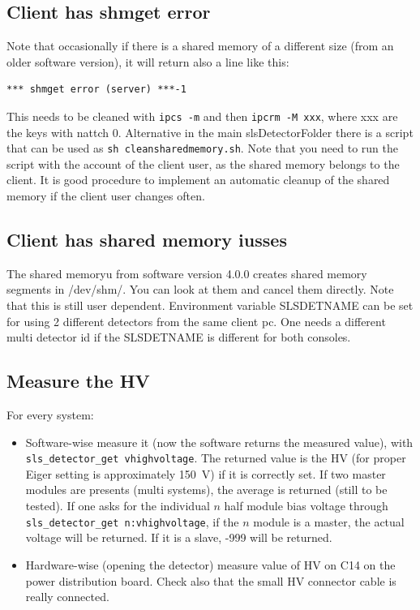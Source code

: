 \documentclass{article}
\begin{document}
\subsection{Client has \textbf{shmget error}}
Note that occasionally if there is a shared memory of a different size (from an older software version), it will return also a line like this:
\begin{verbatim}
*** shmget error (server) ***-1
\end{verbatim}
This needs to be cleaned with {\tt{ipcs -m}} and then {\tt{ipcrm -M xxx}}, where xxx are the keys with nattch 0. Alternative in the main slsDetectorFolder there is a script that can be used as {\tt{sh cleansharedmemory.sh}}. Note that you need to run the script with the account of the client user, as the shared memory belongs to the client. It is good procedure to implement an automatic cleanup of the shared memory if the client user changes often.   

\subsection{Client has shared memory iusses}
The shared memoryu from software version 4.0.0 creates shared memory segments in /dev/shm/. You can look at them and cancel them directly. Note that this is still user dependent.
Environment variable SLSDETNAME can be set for using 2 different detectors from the same client pc. One needs a different multi detector id if the SLSDETNAME is different for both consoles.

\subsection{Measure the HV}
For every system: 
\begin{itemize}
\item Software-wise measure it (now the software returns the measured value), with {\tt{sls\_detector\_get vhighvoltage}}. The returned value is the HV (for proper Eiger setting is approximately 150~V) if it is correctly set. If two master modules are presents (multi systems), the average is returned (still to be tested). If one asks for the individual $n$ half module bias voltage through {\tt{sls\_detector\_get n:vhighvoltage}}, if the $n$ module is a master, the actual voltage will be returned. If it is a slave, -999 will be returned. 
\item Hardware-wise (opening the detector) measure value of HV on C14 on the power distribution board. Check also that the small HV connector cable is really connected. 
 \end{itemize}
\end{document}

